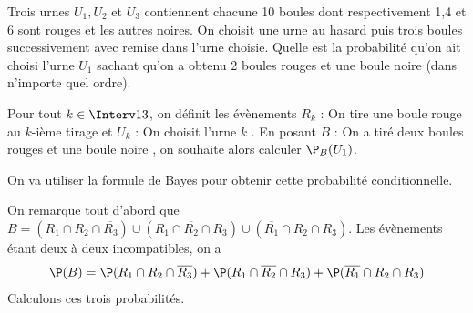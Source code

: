 \documentclass[a4paper,10pt]{report}
\begin{document}
\begin{Exercice}{} Trois urnes $U_1, U_2 $ et $U_3$ contiennent chacune 10 boules dont respectivement 1,4 et 6 sont rouges et les autres noires. On choisit une urne au hasard puis trois boules successivement avec remise dans l'urne choisie. Quelle est la probabilité qu'on ait choisi l'urne $U_1$ sachant qu'on a obtenu 2 boules rouges et une boule noire (dans n'importe quel ordre).
\end{Exercice}

\corr Pour tout $k \in \Interv13$, on définit les évènements $R_k$ : \og On tire une boule rouge au $k$-ième tirage \fg et $U_k$ : \og On choisit l'urne $k$ \fg . En posant $B$ : \og On a tiré deux boules rouges et une boule noire \fg , on souhaite  alors calculer $\P_B(U_1)$.

\vspace{0.2cm}

\noindent On va utiliser la formule de Bayes pour obtenir cette probabilité conditionnelle.

\vspace{0.2cm}

\noindent On remarque tout d'abord que $B = (R_1 \cap R_2 \cap \overline{R_3}) \cup (R_1 \cap \overline{R_2} \cap R_3) \cup (\overline{R_1} \cap R_2 \cap R_3)$. Les évènements étant deux à deux incompatibles, on a 
\[ \P(B) = \P( R_1 \cap R_2 \cap \overline{R_3}) + \P(R_1 \cap \overline{R_2} \cap R_3) + \P(\overline{R_1} \cap R_2 \cap R_3) \]
\noindent Calculons ces trois probabilités.
\end{document}
